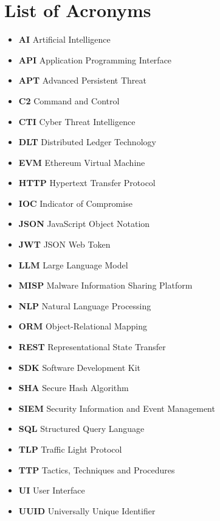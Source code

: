 \documentclass[12pt,a4paper,oneside]{book}
\begin{document}
{{
\tableofcontents{}
\newpage
\listoffigures
\newpage
\listoftables
\newpage
{}

\chapter*{List of Acronyms}
\begin{itemize}
\item \textbf{AI} Artificial Intelligence
\item \textbf{API} Application Programming Interface
\item \textbf{APT} Advanced Persistent Threat
\item \textbf{C2} Command and Control
\item \textbf{CTI} Cyber Threat Intelligence
\item \textbf{DLT} Distributed Ledger Technology
\item \textbf{EVM} Ethereum Virtual Machine
\item \textbf{HTTP} Hypertext Transfer Protocol
\item \textbf{IOC} Indicator of Compromise
\item \textbf{JSON} JavaScript Object Notation
\item \textbf{JWT} JSON Web Token
\item \textbf{LLM} Large Language Model
\item \textbf{MISP} Malware Information Sharing Platform
\item \textbf{NLP} Natural Language Processing
\item \textbf{ORM} Object-Relational Mapping
\item \textbf{REST} Representational State Transfer
\item \textbf{SDK} Software Development Kit
\item \textbf{SHA} Secure Hash Algorithm
\item \textbf{SIEM} Security Information and Event Management
\item \textbf{SQL} Structured Query Language
\item \textbf{TLP} Traffic Light Protocol
\item \textbf{TTP} Tactics, Techniques and Procedures
\item \textbf{UI} User Interface
\item \textbf{UUID} Universally Unique Identifier
\end{itemize}

}}
\end{document}
